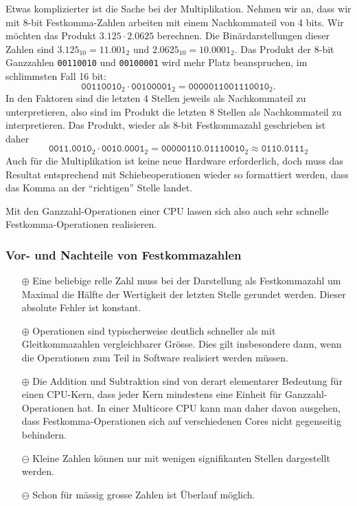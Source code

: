 Etwas komplizierter ist die Sache bei der Multiplikation.
Nehmen wir an, dass wir mit 8-bit Festkomma-Zahlen arbeiten mit
einem Nachkommateil von 4 bits. 
Wir möchten das Produkt $3.125\cdot 2.0625$ berechnen.
Die Binärdarstellungen dieser Zahlen sind
$3.125_{10}=11.001_{2}$ und $2.0625_{10}= 10.0001_{2}$.
Das Produkt der 8-bit Ganzzahlen \texttt{00110010} und \texttt{00100001}
wird mehr Platz beanspruchen, im schlimmsten Fall 16 bit:
\[
\texttt{00110010}_2\cdot\texttt{00100001}_2
=
\texttt{0000011001110010}_2.
\]
In den Faktoren sind die letzten 4 Stellen jeweils als Nachkommateil
zu unterpretieren, also sind im Produkt die letzten 8 Stellen als
Nachkommateil zu interpretieren.
Das Produkt, wieder als 8-bit Festkommazahl geschrieben ist daher
\[
\texttt{0011.0010}_2\cdot\texttt{0010.0001}_2
=
\texttt{00000110.01110010}_2
\approx
\texttt{0110.0111}_2
\]
Auch für die Multiplikation ist keine neue Hardware erforderlich,
doch muss das Resultat entsprechend mit Schiebeoperationen wieder
so formattiert werden, dass das Komma an der ``richtigen'' Stelle
landet.
%

Mit den Ganzzahl-Operationen einer CPU lassen sich also auch sehr
schnelle Festkomma-Ope\-ra\-tio\-nen realisieren.

\subsubsection{Vor- und Nachteile von Festkommazahlen}
\begin{itemize}
\item[$\oplus$]
Eine beliebige relle Zahl muss bei der Darstellung als Festkommazahl
um Maximal die Hälfte der Wertigkeit der letzten Stelle gerundet werden.
Dieser absolute Fehler ist konstant.
%
%
\item[$\oplus$]
Operationen sind typischerweise deutlich schneller als
mit Gleitkommazahlen vergleichbarer Grösse.
Dies gilt insbesondere dann, wenn die Operationen zum Teil in Software 
realisiert werden müssen.
\item[$\oplus$] Die Addition und Subtraktion sind von derart elementarer
Bedeutung für einen CPU-Kern, dass jeder Kern mindestens eine Einheit
für Ganzzahl-Operationen hat.
In einer Multicore CPU kann man daher davon ausgehen, dass Festkomma-Operationen
sich auf verschiedenen Cores nicht gegenseitig behindern.
%
\item[$\ominus$] Kleine Zahlen können nur mit wenigen signifikanten
Stellen dargestellt werden.
%
\item[$\ominus$] Schon für mässig grosse Zahlen ist Überlauf möglich.
%
\end{itemize}

